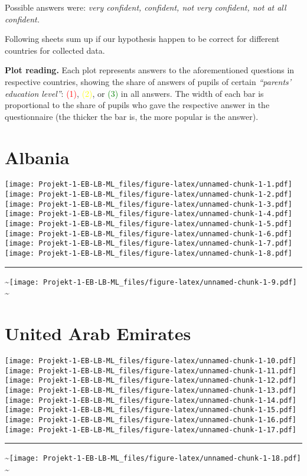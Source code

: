 \documentclass[]{article}
\begin{document}
Possible answers were: \emph{very confident, confident, not very
confident, not at all confident.}

Following sheets sum up if our hypothesis happen to be correct for
different countries for collected data.

\textbf{Plot reading.} Each plot represents answers to the
aforementioned questions in respective countries, showing the share of
answers of pupils of certain \emph{``parents' education level''}:
\textcolor{red}{(1)}, \textcolor{yellow}{(2)}, or \textcolor{green}{(3)}
in all answers. The width of each bar is proportional to the share of
pupils who gave the respective answer in the questionnaire (the thicker
the bar is, the more popular is the answer).

\vfill\eject

\begin{multicols}{3}

\tableofcontents

\end{multicols}

\vfill\eject

\section{Albania}\label{albania}

\texttt{[image: Projekt-1-EB-LB-ML\_files/figure-latex/unnamed-chunk-1-1.pdf]}
\texttt{[image: Projekt-1-EB-LB-ML\_files/figure-latex/unnamed-chunk-1-2.pdf]}
\texttt{[image: Projekt-1-EB-LB-ML\_files/figure-latex/unnamed-chunk-1-3.pdf]}
\texttt{[image: Projekt-1-EB-LB-ML\_files/figure-latex/unnamed-chunk-1-4.pdf]}
\texttt{[image: Projekt-1-EB-LB-ML\_files/figure-latex/unnamed-chunk-1-5.pdf]}
\texttt{[image: Projekt-1-EB-LB-ML\_files/figure-latex/unnamed-chunk-1-6.pdf]}
\texttt{[image: Projekt-1-EB-LB-ML\_files/figure-latex/unnamed-chunk-1-7.pdf]}
\texttt{[image: Projekt-1-EB-LB-ML\_files/figure-latex/unnamed-chunk-1-8.pdf]}
\bigskip\hrule\bigskip
\textasciitilde{}\hfill\texttt{[image: Projekt-1-EB-LB-ML\_files/figure-latex/unnamed-chunk-1-9.pdf]}
\hfill \textasciitilde{} \vfill\eject

\section{United Arab Emirates}\label{united-arab-emirates}

\texttt{[image: Projekt-1-EB-LB-ML\_files/figure-latex/unnamed-chunk-1-10.pdf]}
\texttt{[image: Projekt-1-EB-LB-ML\_files/figure-latex/unnamed-chunk-1-11.pdf]}
\texttt{[image: Projekt-1-EB-LB-ML\_files/figure-latex/unnamed-chunk-1-12.pdf]}
\texttt{[image: Projekt-1-EB-LB-ML\_files/figure-latex/unnamed-chunk-1-13.pdf]}
\texttt{[image: Projekt-1-EB-LB-ML\_files/figure-latex/unnamed-chunk-1-14.pdf]}
\texttt{[image: Projekt-1-EB-LB-ML\_files/figure-latex/unnamed-chunk-1-15.pdf]}
\texttt{[image: Projekt-1-EB-LB-ML\_files/figure-latex/unnamed-chunk-1-16.pdf]}
\texttt{[image: Projekt-1-EB-LB-ML\_files/figure-latex/unnamed-chunk-1-17.pdf]}
\bigskip\hrule\bigskip
\textasciitilde{}\hfill\texttt{[image: Projekt-1-EB-LB-ML\_files/figure-latex/unnamed-chunk-1-18.pdf]}
\hfill \textasciitilde{} \vfill\eject
\end{document}
